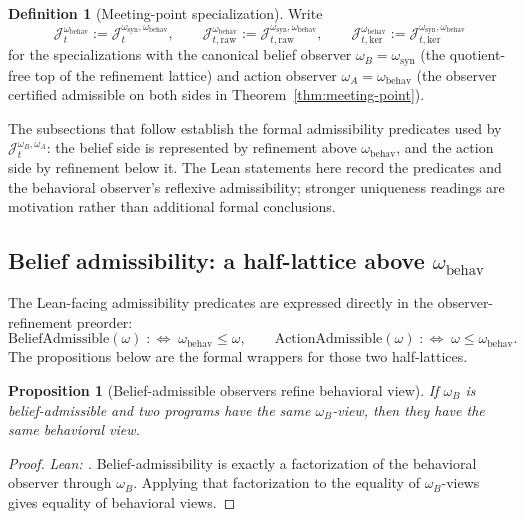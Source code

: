 \documentclass[11pt]{article}
\newtheorem{proposition}[theorem]{Proposition}
\theoremstyle{definition}
\newtheorem{definition}[theorem]{Definition}
\theoremstyle{remark}
\theoremstyle{plain}
\theoremstyle{definition}
\begin{document}
\begin{definition}[Meeting-point specialization]
\label{def:meeting-point-shorthand}
Write
\[
\mathcal J_t^{\omega_{\mathrm{behav}}}:=\mathcal J_t^{\omega_{\mathrm{syn}},\omega_{\mathrm{behav}}},
\qquad
\mathcal J_{t,\mathrm{raw}}^{\omega_{\mathrm{behav}}}:=\mathcal J_{t,\mathrm{raw}}^{\omega_{\mathrm{syn}},\omega_{\mathrm{behav}}},
\qquad
\mathcal J_{t,\mathrm{ker}}^{\omega_{\mathrm{behav}}}:=\mathcal J_{t,\mathrm{ker}}^{\omega_{\mathrm{syn}},\omega_{\mathrm{behav}}}
\]
for the specializations with the canonical belief observer $\omega_B=\omega_{\mathrm{syn}}$ (the quotient-free top of the refinement lattice) and action observer $\omega_A=\omega_{\mathrm{behav}}$ (the observer certified admissible on both sides in Theorem~\ref{thm:meeting-point}).
\end{definition}

The subsections that follow establish the formal admissibility predicates used by $\mathcal J_t^{\omega_B,\omega_A}$: the belief side is represented by refinement above $\omega_{\mathrm{behav}}$, and the action side by refinement below it. The Lean statements here record the predicates and the behavioral observer's reflexive admissibility; stronger uniqueness readings are motivation rather than additional formal conclusions.

\subsection{Belief admissibility: a half-lattice above $\omega_{\mathrm{behav}}$}
\label{sec:belief-admissibility}

The Lean-facing admissibility predicates are expressed directly in the observer-refinement preorder:
\[
\mathrm{BeliefAdmissible}(\omega)\;:\!\!\Longleftrightarrow\;\omega_{\mathrm{behav}}\le\omega,
\qquad
\mathrm{ActionAdmissible}(\omega)\;:\!\!\Longleftrightarrow\;\omega\le\omega_{\mathrm{behav}}.
\]
The propositions below are the formal wrappers for those two half-lattices.

\begin{proposition}[Belief-admissible observers refine behavioral view]
\label{prop:belief-invariance-above}
If $\omega_B$ is belief-admissible and two programs have the same $\omega_B$-view, then they have the same behavioral view.
\end{proposition}

\begin{proof}
\noindent\emph{Lean: .}
Belief-admissibility is exactly a factorization of the behavioral observer through $\omega_B$. Applying that factorization to the equality of $\omega_B$-views gives equality of behavioral views.
\end{proof}
\end{document}
